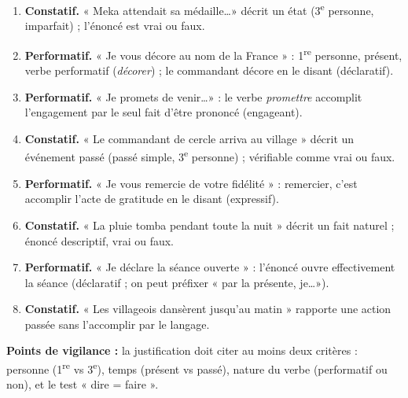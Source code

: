 \documentclass[11pt]{article}
\begin{document}
\begin{corrige}
\begin{enumerate}
\item \textbf{Constatif.} « Meka attendait sa médaille\ldots » décrit un état (3\textsuperscript{e} personne, imparfait) ; l'énoncé est vrai ou faux.
\item \textbf{Performatif.} « Je vous décore au nom de la France » : 1\textsuperscript{re} personne, présent, verbe performatif (\textit{décorer}) ; le commandant décore en le disant (déclaratif).
\item \textbf{Performatif.} « Je promets de venir\ldots » : le verbe \textit{promettre} accomplit l'engagement par le seul fait d'être prononcé (engageant).
\item \textbf{Constatif.} « Le commandant de cercle arriva au village » décrit un événement passé (passé simple, 3\textsuperscript{e} personne) ; vérifiable comme vrai ou faux.
\item \textbf{Performatif.} « Je vous remercie de votre fidélité » : remercier, c'est accomplir l'acte de gratitude en le disant (expressif).
\item \textbf{Constatif.} « La pluie tomba pendant toute la nuit » décrit un fait naturel ; énoncé descriptif, vrai ou faux.
\item \textbf{Performatif.} « Je déclare la séance ouverte » : l'énoncé ouvre effectivement la séance (déclaratif ; on peut préfixer « par la présente, je\ldots »).
\item \textbf{Constatif.} « Les villageois dansèrent jusqu'au matin » rapporte une action passée sans l'accomplir par le langage.
\end{enumerate}
\textbf{Points de vigilance :} la justification doit citer au moins deux critères : personne (1\textsuperscript{re} vs 3\textsuperscript{e}), temps (présent vs passé), nature du verbe (performatif ou non), et le test « dire = faire ».
\end{corrige}
\end{document}
